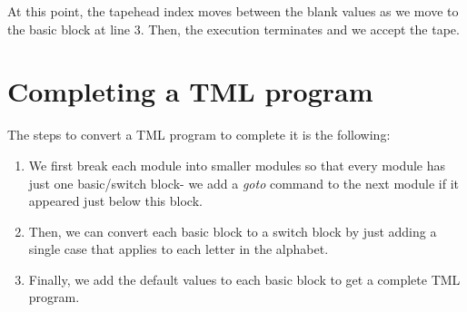 \begin{figure}[H]
    \centering
\end{figure}
\noindent At this point, the tapehead index moves between the blank values as we move to the basic block at line 3. Then, the execution terminates and we accept the tape.

\section{Completing a TML program}
The steps to convert a TML program to complete it is the following:
\begin{enumerate}
    \item We first break each module into smaller modules so that every module has just one basic/switch block- we add a \textit{goto} command to the next module if it appeared just below this block.
    \item Then, we can convert each basic block to a switch block by just adding a single case that applies to each letter in the alphabet.
    \item Finally, we add the default values to each basic block to get a complete TML program.
\end{enumerate}

